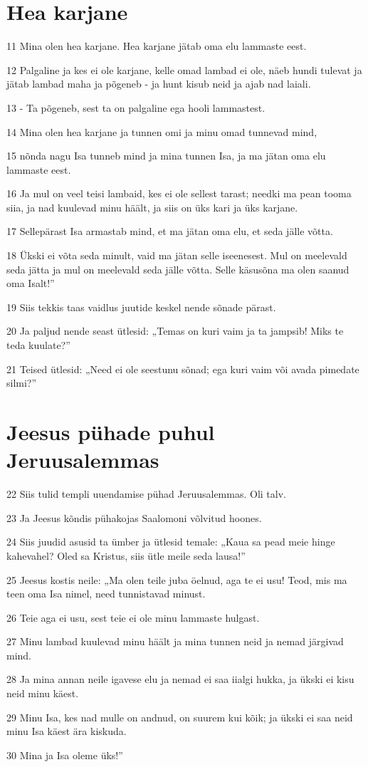 \section*{Hea karjane}

\par 11 Mina olen hea karjane. Hea karjane jätab oma elu lammaste eest.
\par 12 Palgaline ja kes ei ole karjane, kelle omad lambad ei ole, näeb hundi tulevat ja jätab lambad maha ja põgeneb - ja hunt kisub neid ja ajab nad laiali.
\par 13 - Ta põgeneb, sest ta on palgaline ega hooli lammastest.
\par 14 Mina olen hea karjane ja tunnen omi ja minu omad tunnevad mind,
\par 15 nõnda nagu Isa tunneb mind ja mina tunnen Isa, ja ma jätan oma elu lammaste eest.
\par 16 Ja mul on veel teisi lambaid, kes ei ole sellest tarast; needki ma pean tooma siia, ja nad kuulevad minu häält, ja siis on üks kari ja üks karjane.
\par 17 Sellepärast Isa armastab mind, et ma jätan oma elu, et seda jälle võtta.
\par 18 Ükski ei võta seda minult, vaid ma jätan selle iseenesest. Mul on meelevald seda jätta ja mul on meelevald seda jälle võtta. Selle käsusõna ma olen saanud oma Isalt!”
\par 19 Siis tekkis taas vaidlus juutide keskel nende sõnade pärast.
\par 20 Ja paljud nende seast ütlesid: „Temas on kuri vaim ja ta jampsib! Miks te teda kuulate?”
\par 21 Teised ütlesid: „Need ei ole seestunu sõnad; ega kuri vaim või avada pimedate silmi?”

\section*{Jeesus pühade puhul Jeruusalemmas}

\par 22 Siis tulid templi uuendamise pühad Jeruusalemmas. Oli talv.
\par 23 Ja Jeesus kõndis pühakojas Saalomoni võlvitud hoones.
\par 24 Siis juudid asusid ta ümber ja ütlesid temale: „Kaua sa pead meie hinge kahevahel? Oled sa Kristus, siis ütle meile seda lausa!”
\par 25 Jeesus kostis neile: „Ma olen teile juba öelnud, aga te ei usu! Teod, mis ma teen oma Isa nimel, need tunnistavad minust.
\par 26 Teie aga ei usu, sest teie ei ole minu lammaste hulgast.
\par 27 Minu lambad kuulevad minu häält ja mina tunnen neid ja nemad järgivad mind.
\par 28 Ja mina annan neile igavese elu ja nemad ei saa iialgi hukka, ja ükski ei kisu neid minu käest.
\par 29 Minu Isa, kes nad mulle on andnud, on suurem kui kõik; ja ükski ei saa neid minu Isa käest ära kiskuda.
\par 30 Mina ja Isa oleme üks!”

